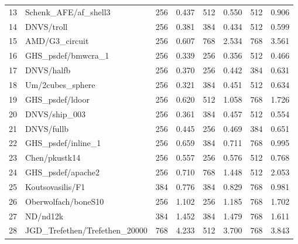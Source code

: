 \begin{tabular}{rl|rr|rr|rr}
  13     & Schenk\_AFE/af\_shell3          & 256                              & 0.437  & 512       & 0.550  & 512  & 0.906  \\
  14     & DNVS/troll                      & 256                              & 0.381  & 384       & 0.434  & 512  & 0.599  \\
  15     & AMD/G3\_circuit                 & 256                              & 0.607  & 768       & 2.534  & 768  & 3.561  \\
  16     & GHS\_psdef/bmwcra\_1            & 256                              & 0.339  & 256       & 0.356  & 512  & 0.466  \\
  17     & DNVS/halfb                      & 256                              & 0.370  & 256       & 0.442  & 384  & 0.631  \\
  18     & Um/2cubes\_sphere               & 256                              & 0.321  & 384       & 0.451  & 512  & 0.634  \\
  19     & GHS\_psdef/ldoor                & 256                              & 0.620  & 512       & 1.058  & 768  & 1.726  \\
  20     & DNVS/ship\_003                  & 256                              & 0.361  & 384       & 0.457  & 512  & 0.554  \\
  21     & DNVS/fullb                      & 256                              & 0.445  & 256       & 0.469  & 384  & 0.651  \\
  22     & GHS\_psdef/inline\_1            & 256                              & 0.659  & 384       & 0.711  & 768  & 0.995  \\
  23     & Chen/pkustk14                   & 256                              & 0.557  & 256       & 0.576  & 512  & 0.768  \\
  24     & GHS\_psdef/apache2              & 256                              & 0.710  & 768       & 1.448  & 512  & 2.053  \\
  25     & Koutsovasilis/F1                & 384                              & 0.776  & 384       & 0.829  & 768  & 0.981  \\
  26     & Oberwolfach/boneS10             & 256                              & 1.102  & 256       & 1.185  & 768  & 1.702  \\
  27     & ND/nd12k                        & 384                              & 1.452  & 384       & 1.479  & 768  & 1.611  \\
  28     & JGD\_Trefethen/Trefethen\_20000 & 768                              & 4.233  & 512       & 3.700  & 768  & 3.843  \\

\end{tabular}
